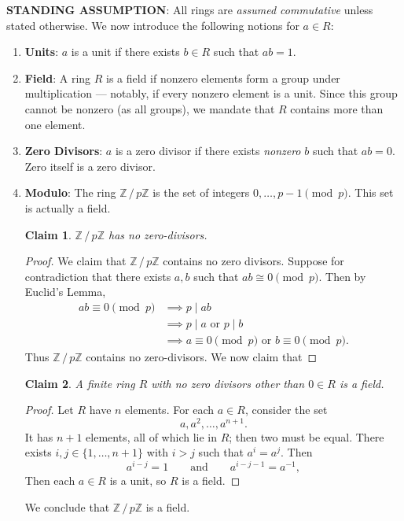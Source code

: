 \documentclass[11pt]{article}
\newtheorem{claim}{Claim}
\begin{document}
\textbf{STANDING ASSUMPTION}: All rings are \textit{assumed commutative} unless stated otherwise. We now introduce the following notions for $a \in R$:
\begin{enumerate}
	\item \textbf{Units}: $a$ is a unit if there exists $b \in R$ such that $ab = 1$.
	\item \textbf{Field}: A ring $R$ is a field if nonzero elements form a group under multiplication --- notably, if every nonzero element is a unit. Since this group cannot be nonzero (as all groups), we mandate that $R$ contains more than one element.
	\item \textbf{Zero Divisors}: $a$ is a zero divisor if there exists \textit{nonzero} $b$ such that $ab = 0$. Zero itself is a zero divisor.
	\item \textbf{Modulo}: The ring $\mathbb{Z} \,/\, p \mathbb{Z}$ is the set of integers $0, \ldots, p - 1 \pmod{p}$. This set is actually a field.
		\begin{adjustwidth}{0.5cm}{}
			\begin{claim}
				$\mathbb{Z} \,/\, p \mathbb{Z}$ has no zero-divisors.
			\end{claim}
			\begin{proof}\renewcommand{\qedsymbol}{}
				We claim that $\mathbb{Z} \,/\, p \mathbb{Z}$ contains no zero divisors. Suppose for contradiction that there exists $a, b$ such that $ab \cong 0 \pmod{p}$. Then by Euclid's Lemma,
				\begin{align*}
					ab \equiv 0 \pmod{p} &\implies p \mid ab \\
					&\implies p \mid a \text{ or } p \mid b \\
					&\implies a \equiv 0 \pmod{p} \text{ or } b \equiv 0 \pmod{p}.
				\end{align*}
				Thus $\mathbb{Z} \,/\, p \mathbb{Z}$ contains no zero-divisors.
				We now claim that
			\end{proof}
		\end{adjustwidth} 
		\begin{adjustwidth}{0.5cm}{}
			\begin{claim}
				A finite ring $R$ with no zero divisors other than $0 \in R$ is a field.
			\end{claim}
			\begin{proof}\renewcommand{\qedsymbol}{}
				Let $R$ have $n$ elements. For each $a \in R$, consider the set
				\[
					a, a^{2}, \ldots, a^{n + 1}.
				\]
				It has $n + 1$ elements, all of which lie in $R$; then two must be equal. There exists $i, j \in \{ 1, \ldots, n + 1 \}$ with $i > j$ such that $a^{i} = a^{j}$. Then
				\[
					a^{i - j} = 1 \qquad \text{and} \qquad a^{i - j - 1} = a^{-1},
				\]
				Then each $a \in R$ is a unit, so $R$ is a field.
			\end{proof}
		\end{adjustwidth}
	We conclude that $\mathbb{Z} \,/\, p \mathbb{Z}$ is a field.
\end{enumerate}
\end{document}
